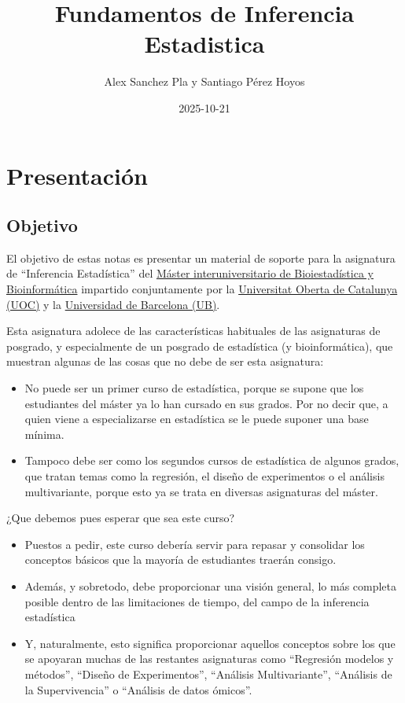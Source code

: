 \documentclass[
]{article}
\title{Fundamentos de Inferencia Estadistica}
\author{Alex Sanchez Pla y Santiago Pérez Hoyos}
\date{2025-10-21}
\providecommand{\tightlist}{%
  \setlength{\itemsep}{0pt}\setlength{\parskip}{0pt}}
\begin{document}
\maketitle

{
\setcounter{tocdepth}{2}
\tableofcontents
}
\section*{Presentación}\label{presentaciuxf3n}

\subsection*{Objetivo}\label{objetivo}

El objetivo de estas notas es presentar un material de soporte para la asignatura de ``Inferencia Estadística'' del \href{https://www.uoc.edu/es/estudios/masters/master-universitario-bioinformatica-bioestadistica}{Máster interuniversitario de Bioiestadística y Bioinformática} impartido conjuntamente por la \href{https://www.uoc.edu}{Universitat Oberta de Catalunya (UOC)} y la \href{https://www.ub.edu}{Universidad de Barcelona (UB)}.

Esta asignatura adolece de las características habituales de las asignaturas de posgrado, y especialmente de un posgrado de estadística (y bioinformática), que muestran algunas de las cosas que no debe de ser esta asignatura:

\begin{itemize}
\tightlist
\item
  No puede ser un primer curso de estadística, porque se supone que los estudiantes del máster ya lo han cursado en sus grados. Por no decir que, a quien viene a especializarse en estadística se le puede suponer una base mínima.
\item
  Tampoco debe ser como los segundos cursos de estadística de algunos grados, que tratan temas como la regresión, el diseño de experimentos o el análisis multivariante, porque esto ya se trata en diversas asignaturas del máster.
\end{itemize}

¿Que debemos pues esperar que sea este curso?

\begin{itemize}
\tightlist
\item
  Puestos a pedir, este curso debería servir para repasar y consolidar los conceptos básicos que la mayoría de estudiantes traerán consigo.
\item
  Además, y sobretodo, debe proporcionar una visión general, lo más completa posible dentro de las limitaciones de tiempo, del campo de la inferencia estadística
\item
  Y, naturalmente, esto significa proporcionar aquellos conceptos sobre los que se apoyaran muchas de las restantes asignaturas como ``Regresión modelos y métodos'', ``Diseño de Experimentos'', ``Análisis Multivariante'', ``Análisis de la Supervivencia'' o ``Análisis de datos ómicos''.
\end{itemize}
\end{document}
